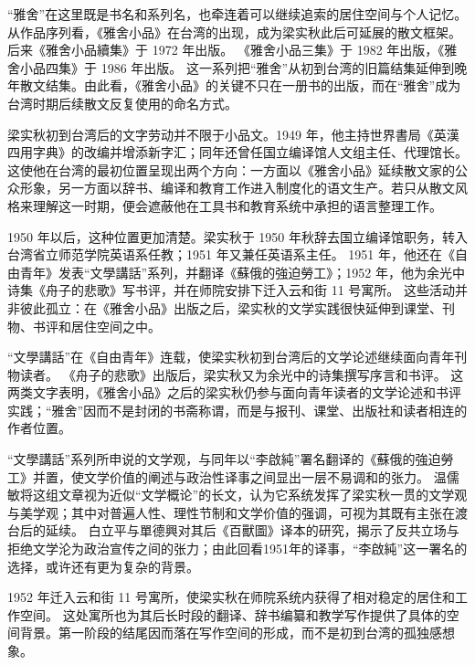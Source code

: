 \documentclass[UTF8,a4paper,zihao=-4,fontset=none]{ctexart}
\begin{document}
“雅舍”在这里既是书名和系列名，也牵连着可以继续追索的居住空间与个人记忆。从作品序列看，《雅舍小品》在台湾的出现，成为梁实秋此后可延展的散文框架。后来《雅舍小品續集》于 1972 年出版。\autocite{liang1972_yashe_xiaopin_xuji,nmtl_liang_chronology} 《雅舍小品三集》于 1982 年出版，《雅舍小品四集》于 1986 年出版。\autocite{liang1982_yashe_xiaopin_sanji,liang1986_yashe_xiaopin_siji,nmtl_liang_chronology} 这一系列把“雅舍”从初到台湾的旧篇结集延伸到晚年散文结集。由此看，《雅舍小品》的关键不只在一册书的出版，而在“雅舍”成为台湾时期后续散文反复使用的命名方式。

梁实秋初到台湾后的文字劳动并不限于小品文。1949 年，他主持世界書局《英漢四用字典》的改编并增添新字汇；同年还曾任国立编译馆人文组主任、代理馆长。\autocite{nmtl_liang_chronology} 这使他在台湾的最初位置呈现出两个方向：一方面以《雅舍小品》延续散文家的公众形象，另一方面以辞书、编译和教育工作进入制度化的语文生产。若只从散文风格来理解这一时期，便会遮蔽他在工具书和教育系统中承担的语言整理工作。

1950 年以后，这种位置更加清楚。梁实秋于 1950 年秋辞去国立编译馆职务，转入台湾省立师范学院英语系任教；1951 年又兼任英语系主任。\autocite{nmtl_liang_chronology} 1951 年，他还在《自由青年》发表“文學講話”系列，并翻译《蘇俄的強迫勞工》；1952 年，他为余光中诗集《舟子的悲歌》写书评，并在师院安排下迁入云和街 11 号寓所。\autocite{nmtl_liang_chronology} 这些活动并非彼此孤立：在《雅舍小品》出版之后，梁实秋的文学实践很快延伸到课堂、刊物、书评和居住空间之中。

“文學講話”在《自由青年》连载，使梁实秋初到台湾后的文学论述继续面向青年刊物读者。\autocite{nmtl_liang_chronology} 《舟子的悲歌》出版后，梁实秋又为余光中的诗集撰写序言和书评。\autocite{lu2022_yu_liang_humor} 这两类文字表明，《雅舍小品》之后的梁实秋仍参与面向青年读者的文学论述和书评实践；“雅舍”因而不是封闭的书斋称谓，而是与报刊、课堂、出版社和读者相连的作者位置。

“文學講話”系列所申说的文学观，与同年以“李啟純”署名翻译的《蘇俄的強迫勞工》并置，使文学价值的阐述与政治性译事之间显出一层不易调和的张力。\autocite{nmtl_liang_chronology,wen2007_liang_fanzhuti} 温儒敏将这组文章视为近似“文学概论”的长文，认为它系统发挥了梁实秋一贯的文学观与美学观；其中对普遍人性、理性节制和文学价值的强调，可视为其既有主张在渡台后的延续。\autocite{wen2007_liang_fanzhuti} 白立平与單德興对其后《百獸圖》译本的研究，揭示了反共立场与拒绝文学沦为政治宣传之间的张力；由此回看1951年的译事，“李啟純”这一署名的选择，或许还有更为复杂的背景。\autocite{bai2007_liqichun_baishoutu,shan2014_orwell_taiwan}

1952 年迁入云和街 11 号寓所，使梁实秋在师院系统内获得了相对稳定的居住和工作空间。\autocite{nmtl_liang_chronology,ntnu_liang_house_chronology} 这处寓所也为其后长时段的翻译、辞书编纂和教学写作提供了具体的空间背景。第一阶段的结尾因而落在写作空间的形成，而不是初到台湾的孤独感想象。
\end{document}
